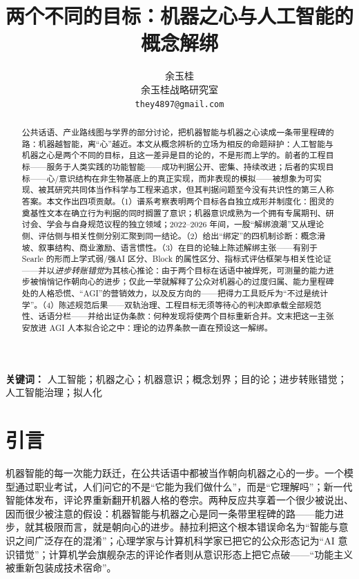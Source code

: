 \documentclass[10pt,fontset=fandol]{ctexart}
\title{两个不同的目标：机器之心与人工智能的概念解绑}
\author{余玉桂\\ 余玉桂战略研究室\\ \texttt{they4897@gmail.com}}
\date{}
\begin{document}
\maketitle

\begin{abstract}
\noindent 公共话语、产业路线图与学界的部分讨论，把机器智能与机器之心读成一条带里程碑的路：机器越智能，离“心”越近。本文从概念辨析的立场为相反的命题辩护：人工智能与机器之心是两个不同的目标，且这一差异是目的论的，不是形而上学的。前者的工程目标——服务于人类实践的功能智能——成功判据公开、密集、持续改进；后者的实现目标——心/意识结构在非生物基底上的真正实现，而非表现的模拟——被想象为可实现、被其研究共同体当作科学与工程来追求，但其判据问题至今没有共识性的第三人称答案。本文作出四项贡献。（1）谱系考察表明两个目标各自独立成形并制度化：图灵的奠基性文本在确立行为判据的同时搁置了意识；机器意识成熟为一个拥有专属期刊、研讨会、学会与自身规范议程的独立领域；2022--2026 年间，一股“解绑浪潮”又从理论侧、评估侧与相关性侧分别汇聚到同一结论。（2）给出“绑定”的四机制诊断：概念滑坡、叙事结构、商业激励、语言惯性。（3）在目的论轴上陈述解绑主张——有别于 Searle 的形而上学式弱/强AI 区分、Block 的属性区分、指标式评估框架与相关性论证——并以\emph{进步转账错觉}为其核心推论：由于两个目标在话语中被焊死，可测量的能力进步被悄悄记作朝向心的进步；仅此一举就解释了公众对机器心的过度归属、能力里程碑处的人格恐慌、“AGI”的营销效力，以及反方向的——把得力工具贬斥为“不过是统计学”。（4）陈述规范后果——双轨治理、工程目标无须等待心的判决即承载全部规范性、话语分栏——并给出证伪条款：何种发现将使两个目标重新合并。文末把这一主张安放进 AGI 人本拟合论之中：理论的边界条款一直在预设这一解绑。
\end{abstract}

\medskip
\noindent\textbf{关键词：} 人工智能；机器之心；机器意识；概念划界；目的论；进步转账错觉；人工智能治理；拟人化

\section{引言}\label{sec:intro}

机器智能的每一次能力跃迁，在公共话语中都被当作朝向机器之心的一步。一个模型通过职业考试，人们问它的不是“它能为我们做什么”，而是“它理解吗”；新一代智能体发布，评论界重新翻开机器人格的卷宗。两种反应共享着一个很少被说出、因而很少被注意的假设：机器智能与机器之心是同一条带里程碑的路——能力进步，就其极限而言，就是朝向心的进步。赫拉利把这个根本错误命名为“智能与意识之间广泛存在的混淆”\cite{harari2024nexus}；心理学家与计算机科学家已把它的公众形态记为“AI 意识错觉”\cite{elmoznino2025illusions}；计算机学会旗舰杂志的评论作者则从意识形态上把它点破——“功能主义被重新包装成技术宿命”\cite{jorge2026harsh}。
\end{document}
